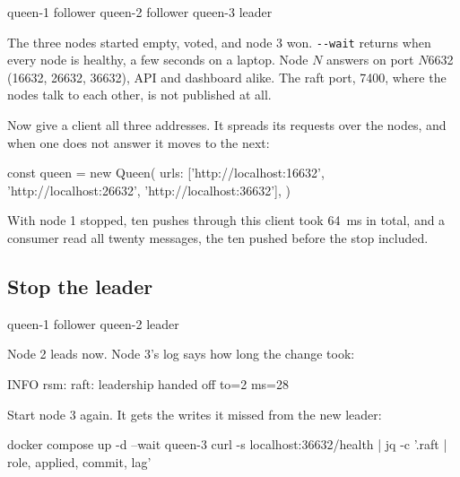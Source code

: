 \begin{shell}
queen-1 follower
queen-2 follower
queen-3 leader
\end{shell}

The three nodes started empty, voted, and node 3 won. \texttt{-{}-wait} returns when every node is
healthy, a few seconds on a laptop. Node $N$ answers on port $N$6632 (16632, 26632, 36632),
API and dashboard alike. The raft port, 7400, where the nodes talk to each other, is not published
at all.


Now give a client all three addresses. It spreads its requests over the nodes, and when one does
not answer it moves to the next:

\begin{code}
const queen = new Queen({
  urls: ['http://localhost:16632', 'http://localhost:26632', 'http://localhost:36632'],
})
\end{code}

With node 1 stopped, ten pushes through this client took 64~ms in total, and a consumer read all
twenty messages, the ten pushed before the stop included.

\subsection{Stop the leader}


\begin{shell}
queen-1 follower
queen-2 leader
\end{shell}

Node 2 leads now. Node 3's log says how long the change took:

\begin{shell}
INFO rsm: raft: leadership handed off to=2 ms=28
\end{shell}

Start node 3 again. It gets the writes it missed from the new leader:

\begin{shell}
docker compose up -d --wait queen-3
curl -s localhost:36632/health | jq -c '.raft | {role, applied, commit, lag}'
\end{shell}

